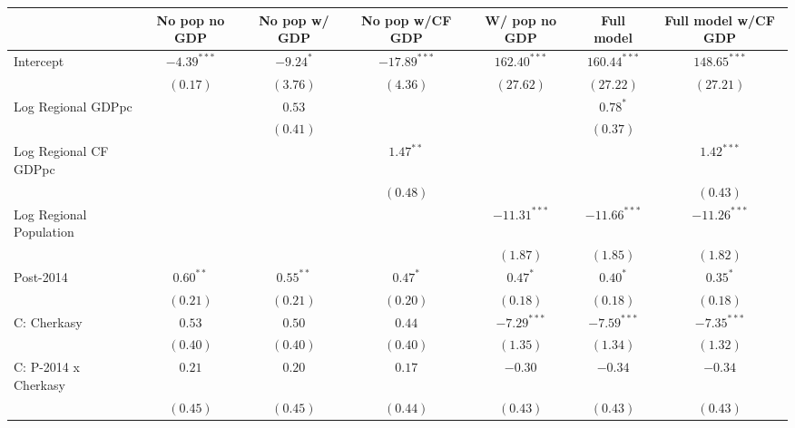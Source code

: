 
\begin{table}
\begin{center}
\begin{small}
\begin{tabular}{l c c c c c c}
\hline
 & No pop
no GDP & No pop
w/ GDP & No pop 
w/CF GDP & W/ pop
no GDP & Full model & Full model w/CF GDP \\
\hline
Intercept                   & $-4.39^{***}$ & $-9.24^{*}$ & $-17.89^{***}$ & $162.40^{***}$ & $160.44^{***}$ & $148.65^{***}$ \\
                            & $(0.17)$      & $(3.76)$    & $(4.36)$       & $(27.62)$      & $(27.22)$      & $(27.21)$      \\
Log Regional GDPpc          &               & $0.53$      &                &                & $0.78^{*}$     &                \\
                            &               & $(0.41)$    &                &                & $(0.37)$       &                \\
Log Regional CF GDPpc       &               &             & $1.47^{**}$    &                &                & $1.42^{***}$   \\
                            &               &             & $(0.48)$       &                &                & $(0.43)$       \\
Log Regional Population     &               &             &                & $-11.31^{***}$ & $-11.66^{***}$ & $-11.26^{***}$ \\
                            &               &             &                & $(1.87)$       & $(1.85)$       & $(1.82)$       \\
Post-2014                   & $0.60^{**}$   & $0.55^{**}$ & $0.47^{*}$     & $0.47^{*}$     & $0.40^{*}$     & $0.35^{*}$     \\
                            & $(0.21)$      & $(0.21)$    & $(0.20)$       & $(0.18)$       & $(0.18)$       & $(0.18)$       \\
C: Cherkasy                 & $0.53$        & $0.50$      & $0.44$         & $-7.29^{***}$  & $-7.59^{***}$  & $-7.35^{***}$  \\
                            & $(0.40)$      & $(0.40)$    & $(0.40)$       & $(1.35)$       & $(1.34)$       & $(1.32)$       \\
C: P-2014 x Cherkasy        & $0.21$        & $0.20$      & $0.17$         & $-0.30$        & $-0.34$        & $-0.34$        \\
                            & $(0.45)$      & $(0.45)$    & $(0.44)$       & $(0.43)$       & $(0.43)$       & $(0.43)$       \\

\end{tabular}
\end{small}
\end{center}
\end{table}
